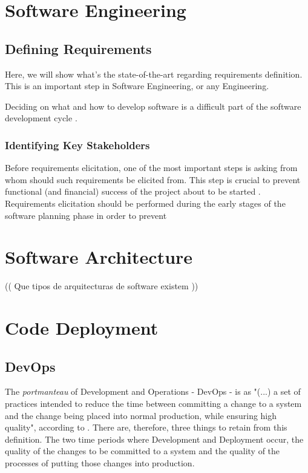 \section{Software Engineering}\label{state-of-the-art:s:software-engineering}

\subsection{Defining Requirements}\label{state-of-the-art:ss:defining-requirements}

Here, we will show what's the state-of-the-art regarding requirements definition. This is an important step in Software Engineering, or any Engineering.

Deciding on what and how to develop software is a difficult part of the software development cycle \parencite{pacheco_garcía_reyes_2018}.

\subsubsection{Identifying Key Stakeholders}\label{state-of-the-art:sss:identifying-key-stakeholders}

Before requirements elicitation, one of the most important steps is asking from whom should such requirements be elicited from. This step is crucial to prevent functional (and financial) success of the project about to be started \parencite{lewellen_2020}. Requirements elicitation should be performed during the early stages of the software planning phase in order to prevent



\section{Software Architecture}\label{state-of-the-art:s:software-architecture}

(( Que tipos de arquitecturas de software existem ))

\section{Code Deployment}\label{state-of-the-art:s:code-deployment}

\subsection{DevOps}\label{state-of-the-art:ss:devops}

The \textit{portmanteau} of Development and Operations - DevOps - is as "(...) a set of practices intended to reduce the time between committing a change to a system and the change being placed into normal production, while ensuring high quality", according to \parencite{bass_weber_zhu_2015}. There are, therefore, three things to retain from this definition. The two time periods where Development and Deployment occur, the quality of the changes to be committed to a system and the quality of the processes of putting those changes into production.

